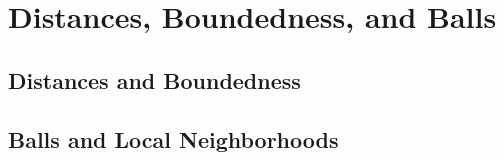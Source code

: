\section{Distances, Boundedness, and Balls}

\subsection{Distances and Boundedness}



\subsection{Balls and Local Neighborhoods}


